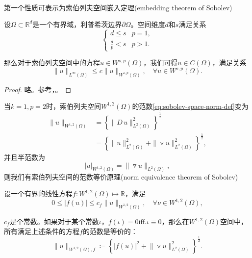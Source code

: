 第一个性质可表示为索伯列夫空间嵌入定理(embedding theorem of Sobolev)
\begin{theorem}[索伯列夫空间的嵌入定理]
  \label{theorem:sobolev-embedding-theorem}
  设$\Omega \subset \mathbb{R}^d$是一个有界域，利普希茨边界$\partial \Omega$。空间维度$d$和$s$满足关系
  \begin{equation*}
    \begin{cases}
      d \le s & p=1,\\
      \frac{d}{p} < s & p >1.
    \end{cases}
  \end{equation*}

  那么对于索伯列夫空间中的方程$u \in W^{s,p}(\Omega)$，我们可得$u \in C(\Omega)$，满足关系
  \begin{equation*}
    \| u \|_{L^{\infty}(\Omega)} \le c \| u \|_{W^{s,p}(\Omega)}, \quad \forall u \in W^{s,p}(\Omega).
  \end{equation*}
\end{theorem}
\begin{proof}
  略。参考\cite[Theorem 1.4.6]{Brenner:2008hf}，\cite[Theorem 3.26]{McLean:2000ta}。
\end{proof}

当$k=1,p=2$时，索伯列夫空间$W^{1,2}(\Omega)$的范数\eqref{eq:sobolev-space-norm-def}变为
\begin{equation*}
\begin{split}
  \| u \|_{W^{1,2}(\Omega)}
  &= \left\{ \big\| D \, u \big\|_{L^{2}(\Omega)}^2 \right\}^{\frac{1}{2}}\\
  &= \left\{
  \|u\|_{L^{2}(\Omega)}^2 + \| \triangledown u \|_{L^{2}(\Omega)}^2
  \right\}^{\frac{1}{2}},
\end{split}
\end{equation*}
并且半范数为
\begin{equation*}
  \left| u \right|_{W^{1,2}(\Omega)} = \| \triangledown u \|_{L^{2}(\Omega)},
\end{equation*}
则我们有索伯列夫空间的范数等价原理(norm equivalence theorem of Sobolev)
\begin{theorem}[索伯列夫空间的范数等价原理]
  设一个有界的线性方程$f:W^{1,2}(\Omega) \mapsto \mathbb{R}$，满足
  \begin{equation*}
    0 \le \left| f(u) \right| \le c_f \big\| u \big\|_{W^{1,2}(\Omega)}, \quad \forall \nu \in W^{1,2}(\Omega),
  \end{equation*}
\end{theorem}
$c_f$是个常数。如果对于某个常数$\iota$，$f(\iota) = 0 \text{iff.} \iota \equiv 0$，那么在$W^{1,2}(\Omega)$空间中，所有满足上述条件的方程$f$的范数是等价的：
\begin{equation}
  \label{eq:sobolev-norm-equivalence-theorem}
  \big\| u \big\|_{W^{1,2}(\Omega), f} \coloneqq \left\{ \left| f(u) \right|^2 + \big\| \triangledown u \big\|_{L^{2}(\Omega)}^2 \right\}^{\frac{1}{2}}.
\end{equation}

